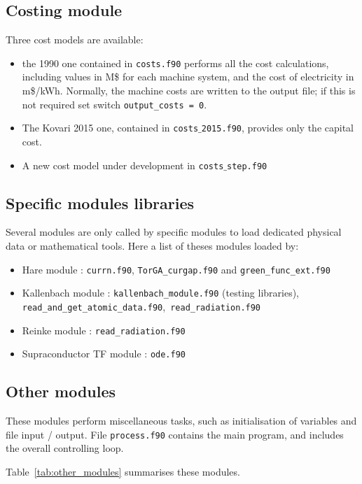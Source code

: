 \documentclass[11pt,a4paper]{report}
\begin{document}
\subsection{Costing module}
Three cost models are available:
\begin{itemize}
	\item the 1990 one contained in \texttt{costs.f90} performs all the cost calculations, 
		including values in M\$ for each machine system, and the cost of electricity
		in m\$/kWh. Normally, the machine costs are written to the output file; if
		this is not required set switch \texttt{output\_costs = 0}. 
	\item The Kovari 2015 one, contained in \texttt{costs$\_$2015.f90}, provides only the capital cost.
	\item A new cost model under development in \texttt{costs$\_$step.f90}
\end{itemize}


\subsection{Specific modules libraries}

Several modules are only called by specific modules to load dedicated physical data or mathematical tools. Here a list of theses modules loaded by:
\begin{itemize}
	\item Hare module : \texttt{currn.f90}, \texttt{TorGA\_curgap.f90} and \texttt{green\_func\_ext.f90}
	\item Kallenbach module : \texttt{kallenbach\_module.f90} (testing libraries), \texttt{read\_and\_get\_atomic\_data.f90},\ \texttt{read\_radiation.f90}
	\item Reinke module : \texttt{read\_radiation.f90}
	\item Supraconductor TF module : \texttt{ode.f90}
\end{itemize}


\subsection{Other modules}
These modules perform miscellaneous tasks, such as initialisation of variables
and file input / output. File \texttt{process.f90} contains the main program,
and includes the overall controlling loop.

Table~\ref{tab:other_modules} summarises these modules.
\end{document}
